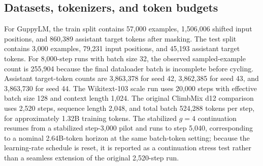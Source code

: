 \documentclass[11pt]{article}
\begin{document}
\subsection{Datasets, tokenizers, and token budgets}

\begin{table}[htbp]
\centering
\caption{Dataset and tokenizer provenance.}
\label{tab:data}
\end{table}

For GuppyLM, the train split contains 57,000 examples, 1,506,006 shifted input positions, and 860,389 assistant target tokens after masking. The test split contains 3,000 examples, 79,231 input positions, and 45,193 assistant target tokens. For 8,000-step runs with batch size 32, the observed sampled-example count is 255,904 because the final dataloader batch is incomplete before cycling. Assistant target-token counts are 3,863,378 for seed 42, 3,862,385 for seed 43, and 3,863,730 for seed 44. The Wikitext-103 scale run uses 20,000 steps with effective batch size 128 and context length 1,024. The original ClimbMix d12 comparison uses 2,520 steps, sequence length 2,048, and total batch 524,288 tokens per step, for approximately 1.32B training tokens. The stabilized \(g=4\) continuation resumes from a stabilized step-3,000 pilot and runs to step 5,040, corresponding to a nominal 2.64B-token horizon at the same batch-token setting; because the learning-rate schedule is reset, it is reported as a continuation stress test rather than a seamless extension of the original 2,520-step run.
\end{document}
